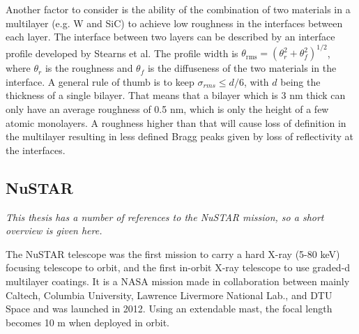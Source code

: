 Another factor to consider is the ability of the combination of two materials in a multilayer (e.g. W and SiC) to achieve low roughness in the interfaces between each layer. The interface between two layers can be described by an interface profile developed by Stearns et al\cite{Stearns:1989va}. The profile width is $\theta_{\text{rms}}=(\theta_r^2 + \theta_f^2)^{1/2}$, where $\theta_r$ is the roughness and $\theta_f$ is the diffuseness of the two materials in the interface. A general rule of thumb is to keep $\sigma_{rms} \leq d/6$, with $d$ being the thickness of a single bilayer. That means that a bilayer which is 3 nm thick can only have an average roughness of 0.5 nm, which is only the height of a few atomic monolayers. A roughness higher than that will cause loss of definition in the multilayer resulting in less defined Bragg peaks given by loss of reflectivity at the interfaces.

\subsection{NuSTAR}\label{sec:nustar}
\emph{This thesis has a number of references to the NuSTAR mission, so a short overview is given here.}

The NuSTAR telescope was the first mission to carry a hard X-ray (5-80 keV) focusing telescope to orbit, and the first in-orbit X-ray telescope to use graded-d multilayer coatings. It is a NASA mission made in collaboration between mainly Caltech, Columbia University, Lawrence Livermore National Lab., and DTU Space and was launched in 2012. Using an extendable mast, the focal length becomes 10 m when deployed in orbit.

